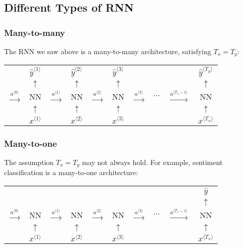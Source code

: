 \subsection{Different Types of RNN}
\subsubsection{Many-to-many}
The RNN we saw above is a many-to-many architecture, satisfying $T_x=T_y$:
\begin{center}
  \begin{tabular}{cccccccccc}
    & $\hat{y}^{\langle 1\rangle}$ & & $\hat{y}^{\langle 2\rangle}$ & & $\hat{y}^{\langle 3\rangle}$ & & & & $\hat{y}^{\langle T_y\rangle}$\\
    & $\uparrow$ & & $\uparrow$ & & $\uparrow$ & & & & $\uparrow$\\ 
    $\xrightarrow{a^{\langle 0\rangle}}$& NN & $\xrightarrow{a^{\langle 1\rangle}}$ & NN & $\xrightarrow{a^{\langle 2\rangle}}$ & NN & $\xrightarrow{a^{\langle 3\rangle}}$ & $\cdots$ & $\xrightarrow{a^{\langle T_x-1\rangle}}$ & NN \\ 
    & $\uparrow$ & & $\uparrow$ & & $\uparrow$ & & & & $\uparrow$\\ 
    & $x^{\langle 1\rangle}$ & & $x^{\langle 2\rangle}$ & & $x^{\langle 3\rangle}$ & & & & $x^{\langle T_x\rangle}$\\
  \end{tabular}
\end{center}
\subsubsection{Many-to-one}
The assumption $T_x=T_y$ may not always hold. For example, sentiment classification is a many-to-one architecture:
\begin{center}
  \begin{tabular}{cccccccccc}
    & & & & & & & & & $\hat{y}$\\
    & & & & & & & & & $\uparrow$\\ 
    $\xrightarrow{a^{\langle 0\rangle}}$& NN & $\xrightarrow{a^{\langle 1\rangle}}$ & NN & $\xrightarrow{a^{\langle 2\rangle}}$ & NN & $\xrightarrow{a^{\langle 3\rangle}}$ & $\cdots$ & $\xrightarrow{a^{\langle T_x-1\rangle}}$ & NN \\ 
    & $\uparrow$ & & $\uparrow$ & & $\uparrow$ & & & & $\uparrow$\\ 
    & $x^{\langle 1\rangle}$ & & $x^{\langle 2\rangle}$ & & $x^{\langle 3\rangle}$ & & & & $x^{\langle T_x\rangle}$\\
  \end{tabular}
\end{center}
